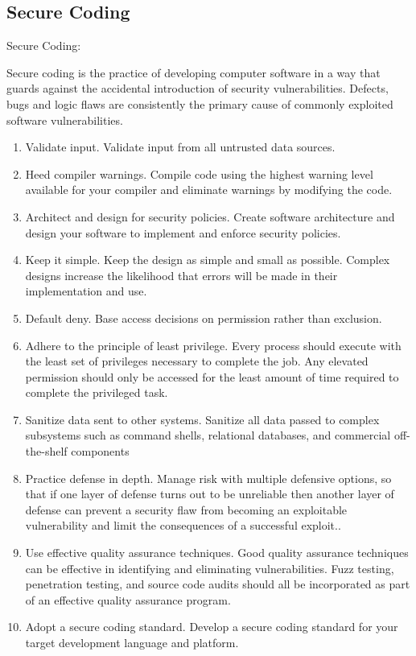 \documentclass{article}
\begin{document}
\subsection{Secure Coding}
    Secure Coding:
     
     Secure coding is the practice of developing computer software in a way that guards against the accidental introduction of security vulnerabilities. Defects, bugs and logic flaws are consistently the primary cause of commonly exploited software vulnerabilities.\cite{confluence}
\begin{enumerate}
    \item Validate input. Validate input from all untrusted data sources. 
    \item	Heed compiler warnings. Compile code using the highest warning level available for your compiler and eliminate warnings by modifying the code.
    \item	 Architect and design for security policies. Create software architecture and design your software to implement and enforce security policies. 
    \item	Keep it simple. Keep the design as simple and small as possible. Complex designs increase the likelihood that errors will be made in their implementation and use.
    \item	Default deny. Base access decisions on permission rather than exclusion. 
    \item	Adhere to the principle of least privilege. Every process should execute with the least set of privileges necessary to complete the job. Any elevated permission should only be accessed for the least amount of time required to complete the privileged task.
    \item	Sanitize data sent to other systems. Sanitize all data passed to complex subsystems such as command shells, relational databases, and commercial off-the-shelf components
    \item	Practice defense in depth. Manage risk with multiple defensive options, so that if one layer of defense turns out to be unreliable then another layer of defense can prevent a security flaw from becoming an exploitable vulnerability and limit the consequences of a successful exploit..
    \item	Use effective quality assurance techniques. Good quality assurance techniques can be effective in identifying and eliminating vulnerabilities. Fuzz testing, penetration testing, and source code audits should all be incorporated as part of an effective quality assurance program. 
    \item	Adopt a secure coding standard. Develop a secure coding standard for your target development language and platform.
\end{enumerate}	
\end{document}
